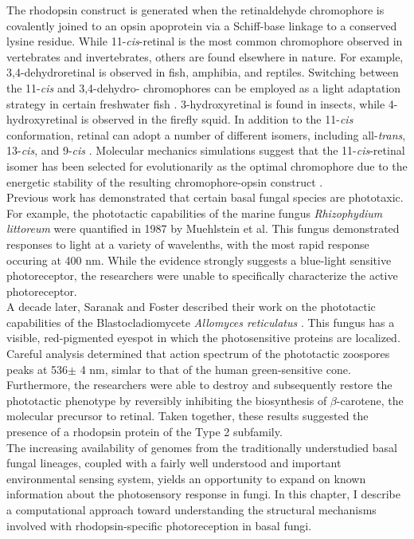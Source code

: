 \indent The rhodopsin construct is generated when the retinaldehyde chromophore is covalently joined to an opsin apoprotein via a Schiff-base linkage to a conserved lysine residue. While 11-\textit{cis}-retinal is the most common chromophore observed in vertebrates and invertebrates, others are found elsewhere in nature. For example, 3,4-dehydroretinal is observed in fish, amphibia, and reptiles. Switching between the 11-\textit{cis} and 3,4-dehydro- chromophores can be employed as a light adaptation strategy in certain freshwater fish \cite{Shichida2009}. 3-hydroxyretinal is found in insects, while 4-hydroxyretinal is observed in the firefly squid. In addition to the 11-\textit{cis} conformation, retinal can adopt a number of different isomers, including all-\textit{trans}, 13-\textit{cis}, and 9-\textit{cis} \cite{Shichida2009}. Molecular mechanics simulations suggest that the 11-\textit{cis}-retinal isomer has been selected for evolutionarily as the optimal chromophore due to the energetic stability of the resulting chromophore-opsin construct \cite{Sekharan2011}.\\ 
\indent Previous work has demonstrated that certain basal fungal species are phototaxic. For example, the phototactic capabilities of the marine fungus \textit{Rhizophydium littoreum} were quantified in 1987 by Muehlstein et al. \nocite{Muehlstein1987} This fungus demonstrated responses to light at a variety of wavelenths, with the most rapid response occuring at 400 nm. While the evidence strongly suggests a blue-light sensitive photoreceptor, the researchers were unable to specifically characterize the active photoreceptor.\\
\indent A decade later, Saranak and Foster described their work on the phototactic capabilities of the Blastocladiomycete \textit{Allomyces reticulatus} \cite{Saranak1997}. This fungus has a visible, red-pigmented eyespot in which the photosensitive proteins are localized. Careful analysis determined that action spectrum of the phototactic zoospores peaks at 536$\pm$ 4 nm, simlar to that of the human green-sensitive cone. Furthermore, the researchers were able to destroy and subsequently restore the phototactic phenotype by reversibly inhibiting the biosynthesis of $\beta$-carotene, the molecular precursor to retinal. Taken together, these results suggested the presence of a rhodopsin protein of the Type 2 subfamily.\\
\indent The increasing availability of genomes from the traditionally understudied basal fungal lineages, coupled with a fairly well understood and important environmental sensing system, yields an opportunity to expand on known information about the photosensory response in fungi. In this chapter, I describe a computational approach toward understanding the structural mechanisms involved with rhodopsin-specific photoreception in basal fungi.\\


